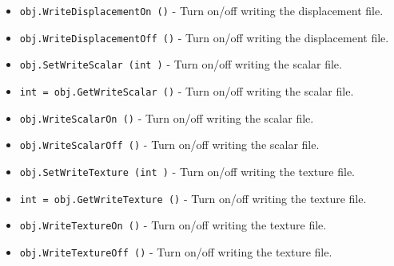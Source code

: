 \begin{itemize}
\item  \verb|obj.WriteDisplacementOn ()| -  Turn on/off writing the displacement file.

\item  \verb|obj.WriteDisplacementOff ()| -  Turn on/off writing the displacement file.

\item  \verb|obj.SetWriteScalar (int )| -  Turn on/off writing the scalar file.

\item  \verb|int = obj.GetWriteScalar ()| -  Turn on/off writing the scalar file.

\item  \verb|obj.WriteScalarOn ()| -  Turn on/off writing the scalar file.

\item  \verb|obj.WriteScalarOff ()| -  Turn on/off writing the scalar file.

\item  \verb|obj.SetWriteTexture (int )| -  Turn on/off writing the texture file.

\item  \verb|int = obj.GetWriteTexture ()| -  Turn on/off writing the texture file.

\item  \verb|obj.WriteTextureOn ()| -  Turn on/off writing the texture file.

\item  \verb|obj.WriteTextureOff ()| -  Turn on/off writing the texture file.

\end{itemize}
